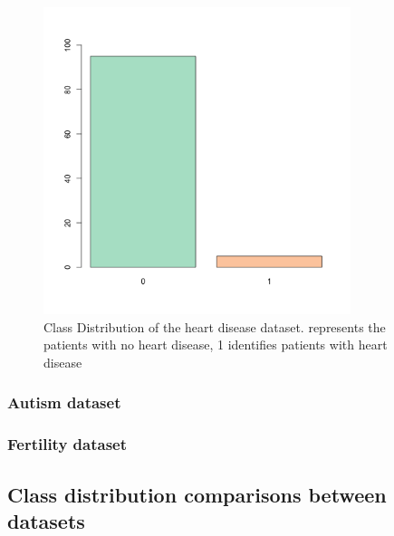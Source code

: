 \begin{figure}[H]
    \centering
    \includegraphics[width=0.8\textwidth]{ThesisTemplate/usingLatex/chapter4Images/figure4_18.png}
    \caption{Class Distribution of the heart disease dataset. represents the patients with no heart disease, 1 identifies patients with heart disease}
    \label{fig:my_label}
\end{figure}

\subsubsection{Autism dataset}




\subsubsection{Fertility dataset}

\subsection{Class distribution comparisons between datasets}


